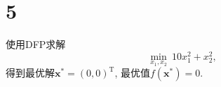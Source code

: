 \section*{5}

使用DFP求解
\begin{equation}
    \min_{x_1,x_2} ~ 10x_1^2+x_2^2,
\end{equation}
得到最优解$\bm{x}^*=(0,0)^\mathrm{T}$, 最优值$f(\bm{x}^*)=0$.
